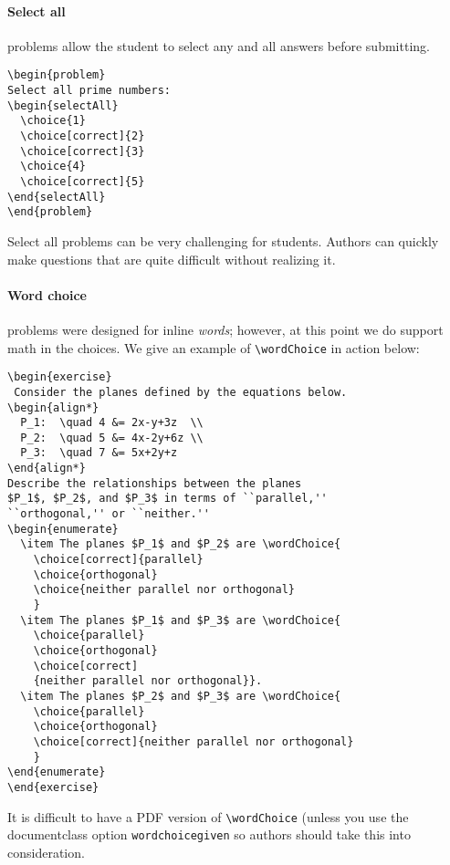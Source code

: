 \documentclass{ximera}
\begin{document}
\paragraph{Select all} problems allow the student to select any and all answers
before
submitting.
\begin{verbatim}
\begin{problem}
Select all prime numbers:
\begin{selectAll}
  \choice{1}
  \choice[correct]{2}
  \choice[correct]{3}
  \choice{4}
  \choice[correct]{5}
\end{selectAll}
\end{problem}
\end{verbatim}

Select all problems can be very challenging for students. Authors can quickly
make
questions that are quite difficult without realizing it.

\paragraph{Word choice}
problems were designed for inline \textit{words}; however, at this
point we
do support math in the choices. We give an example of \verb!\wordChoice! in
action below:
\begin{verbatim}
\begin{exercise}
 Consider the planes defined by the equations below.
\begin{align*}
  P_1:  \quad 4 &= 2x-y+3z  \\
  P_2:  \quad 5 &= 4x-2y+6z \\ 
  P_3:  \quad 7 &= 5x+2y+z
\end{align*}
Describe the relationships between the planes 
$P_1$, $P_2$, and $P_3$ in terms of ``parallel,'' 
``orthogonal,'' or ``neither.''
\begin{enumerate}
  \item The planes $P_1$ and $P_2$ are \wordChoice{
    \choice[correct]{parallel}
    \choice{orthogonal}
    \choice{neither parallel nor orthogonal}
    }
  \item The planes $P_1$ and $P_3$ are \wordChoice{
    \choice{parallel}
    \choice{orthogonal}
    \choice[correct]
    {neither parallel nor orthogonal}}.
  \item The planes $P_2$ and $P_3$ are \wordChoice{
    \choice{parallel}
    \choice{orthogonal}
    \choice[correct]{neither parallel nor orthogonal}
    }
\end{enumerate}
\end{exercise}
\end{verbatim}
It is difficult to have a PDF version of \verb!\wordChoice! (unless you use the
documentclass option \texttt{wordchoicegiven} so authors should
take this into consideration.
\end{document}
